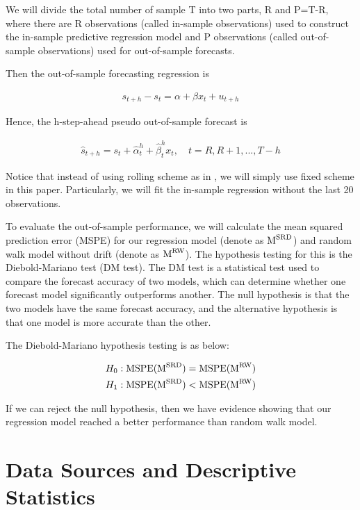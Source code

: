 \documentclass[]{AEA}
\begin{document}
\begin{spacing}{2.0}
We will divide the total number of sample T into two parts, R and P=T-R, where there are R observations (called in-sample observations) used to construct the in-sample predictive regression model and P observations (called out-of-sample observations) used for out-of-sample forecasts.

Then the out-of-sample forecasting regression is

\begin{align}
s_{t+h}-s_t=\alpha+\beta x_t+u_{t+h}
\label{e2}
\end{align}

Hence, the h-step-ahead pseudo out-of-sample forecast is

\begin{align}
\hat s_{t+h}=s_t+\hat \alpha^h_t+\hat \beta^h_t x_t,\quad t=R,R+1,...,T-h
\end{align}

Notice that instead of using rolling scheme as in \cite{chen2019stock}, we will simply use fixed scheme in this paper. Particularly, we will fit the in-sample regression without the last 20 observations.

To evaluate the out-of-sample performance, we will calculate the mean squared prediction error (MSPE) for our regression model (denote as $\text M^{\text{SRD}}$) and random walk model without drift (denote as $\text M^{\text{RW}}$). The hypothesis testing for this is the Diebold-Mariano test (DM test). The DM test is a statistical test used to compare the forecast accuracy of two models, which can determine whether one forecast model significantly outperforms another. The null hypothesis is that the two models have the same forecast accuracy, and the alternative hypothesis is that one model is more accurate than the other.

The Diebold-Mariano hypothesis testing is as below:

\begin{align}
H_0 &: \text{MSPE}(\text M^{\text{SRD}})=\text{MSPE}(\text M^{\text{RW}}) \notag \\
H_1 &: \text{MSPE}(\text M^{\text{SRD}})<\text{MSPE}(\text M^{\text{RW}}) \notag
\end{align}

If we can reject the null hypothesis, then we have evidence showing that our regression model reached a better performance than random walk model.



\section{Data Sources and Descriptive Statistics}




\end{spacing}
\end{document}
